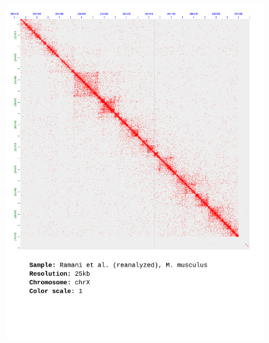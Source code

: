 \documentclass[a4paper,14pt]{extarticle}
\begin{document}
\begin{figure}[hp!] \includegraphics[width=1\textwidth]{ramani-brain_chrX_25kb_1.pdf} \end{figure}
\end{document}
